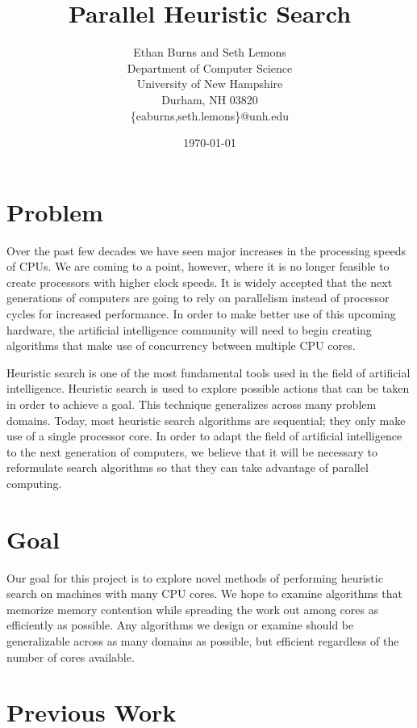 \documentclass{article}
\title{\textbf{Parallel Heuristic Search}}
\author{Ethan Burns and Seth Lemons \\
  Department of Computer Science \\
  University of New Hampshire \\
  Durham, NH 03820 \\
  \{eaburns,seth.lemons\}@unh.edu}
\date{\today}
\begin{document}
\maketitle

\section{Problem}

Over the past few decades we have seen major increases in the
processing speeds of CPUs.  We are coming to a point, however, where
it is no longer feasible to create processors with higher clock
speeds.  It is widely accepted that the next generations of computers
are going to rely on parallelism instead of processor cycles for
increased performance.  In order to make better use of this upcoming
hardware, the artificial intelligence community will need to begin
creating algorithms that make use of concurrency between multiple CPU
cores.

Heuristic search is one of the most fundamental tools used in the
field of artificial intelligence.  Heuristic search is used to explore
possible actions that can be taken in order to achieve a goal.  This
technique generalizes across many problem domains.  Today, most
heuristic search algorithms are sequential; they only make use of a
single processor core.  In order to adapt the field of artificial
intelligence to the next generation of computers, we believe that it
will be necessary to reformulate search algorithms so that they can
take advantage of parallel computing.

\section{Goal}

Our goal for this project is to explore novel methods of performing
heuristic search on machines with many CPU cores. We hope to examine algorithms that memorize memory contention while spreading the work out among cores as efficiently as possible. Any algorithms we design or examine should be generalizable across as many domains as possible, but efficient regardless of the number of cores available.

\section{Previous Work}
\end{document}
